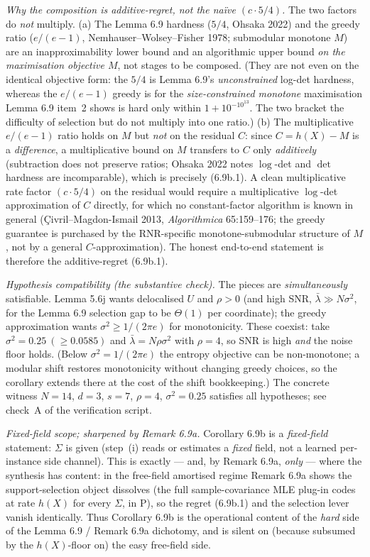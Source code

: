 \documentclass[
]{article}
\begin{document}
\emph{Why the composition is additive-regret, not the na\"ive $(c\cdot 5/4)$.}
The two factors do \emph{not} multiply. (a) The Lemma 6.9 hardness ($5/4$,
Ohsaka 2022) and the greedy ratio ($e/(e-1)$, Nemhauser--Wolsey--Fisher 1978;
submodular monotone $M$) are an inapproximability lower bound and an algorithmic
upper bound \emph{on the maximisation objective $M$}, not stages to be composed.
(They are not even on the identical objective form: the $5/4$ is Lemma 6.9's
\emph{unconstrained} log-det hardness, whereas the $e/(e-1)$ greedy is for the
\emph{size-constrained monotone} maximisation Lemma 6.9 item~2 shows is hard only
within $1+10^{-10^{13}}$. The two bracket the difficulty of selection but do not
multiply into one ratio.) (b) The multiplicative $e/(e-1)$ ratio holds on $M$
but \emph{not} on the residual $C$: since $C=h(X)-M$ is a \emph{difference}, a
multiplicative bound on $M$ transfers to $C$ only \emph{additively} (subtraction
does not preserve ratios; Ohsaka 2022 notes $\log$-det and $\det$ hardness are
incomparable), which is precisely (6.9b.1). A clean multiplicative rate factor
$(c\cdot 5/4)$ on the residual would require a multiplicative $\log$-det
approximation of $C$ directly, for which no constant-factor algorithm is known
in general (\c{C}ivril--Magdon-Ismail 2013, \emph{Algorithmica} 65:159--176; the
greedy guarantee is purchased by the RNR-specific monotone-submodular structure
of $M$, not by a general $C$-approximation). The honest end-to-end statement is
therefore the additive-regret (6.9b.1).

\emph{Hypothesis compatibility (the substantive check).} The pieces are
\emph{simultaneously} satisfiable. Lemma 5.6j wants delocalised $U$ and $\rho>0$
(and high SNR, $\bar\lambda\gg N\sigma^2$, for the Lemma 6.9 selection gap to be
$\Theta(1)$ per coordinate); the greedy approximation wants $\sigma^2\ge
1/(2\pi e)$ for monotonicity. These coexist: take $\sigma^2=0.25\ (\ge 0.0585)$
and $\bar\lambda=N\rho\sigma^2$ with $\rho=4$, so SNR is high \emph{and} the
noise floor holds. (Below $\sigma^2=1/(2\pi e)$ the entropy objective can be
non-monotone; a modular shift restores monotonicity without changing greedy
choices, so the corollary extends there at the cost of the shift bookkeeping.)
The concrete witness $N=14$, $d=3$, $s=7$, $\rho=4$, $\sigma^2=0.25$ satisfies
all hypotheses; see check~A of the verification script.

\emph{Fixed-field scope; sharpened by Remark 6.9a.} Corollary 6.9b is a
\emph{fixed-field} statement: $\Sigma$ is given (step~(i) reads or estimates a
\emph{fixed} field, not a learned per-instance side channel). This is exactly ---
and, by Remark 6.9a, \emph{only} --- where the synthesis has content: in the
free-field amortised regime Remark 6.9a shows the support-selection object
dissolves (the full sample-covariance MLE plug-in codes at rate $h(X)$ for every
$\Sigma$, in $\mathrm P$), so the regret (6.9b.1) and the selection lever vanish
identically. Thus Corollary 6.9b is the operational content of the \emph{hard}
side of the Lemma 6.9 / Remark 6.9a dichotomy, and is silent on (because subsumed
by the $h(X)$-floor on) the easy free-field side.
\end{document}
